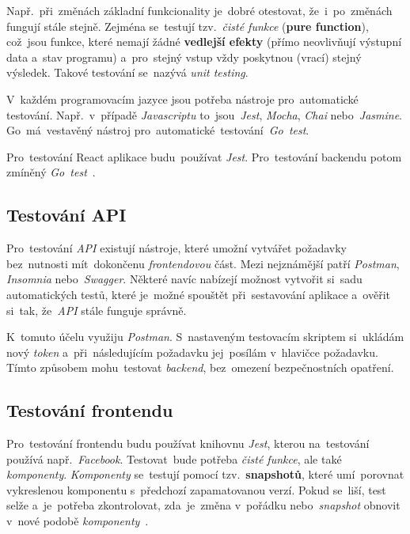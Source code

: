 \documentclass[11pt,a4paper]{report}
\begin{document}
            Např.~při~změnách základní funkcionality je~dobré otestovat, že~i~po~změnách fungují stále stejně. Zejména se~testují tzv.~\emph{čisté funkce} (\textbf{pure function}), což~jsou funkce, které nemají žádné \textbf{vedlejší efekty} (přímo neovlivňují výstupní data a~stav programu) a~pro~stejný vstup vždy poskytnou (vrací) stejný výsledek. Takové testování se~nazývá \emph{unit testing}.
            
            V~každém programovacím jazyce jsou potřeba nástroje pro~automatické testování. Např.~v~případě \emph{Javascriptu} to~jsou~\emph{Jest}, \emph{Mocha}, \emph{Chai} nebo~\emph{Jasmine}. Go~má~vestavěný nástroj pro~automatické~testování~\emph{Go~test}.
            
            Pro~testování React aplikace budu~používat \emph{Jest}. Pro~testování backendu potom zmíněný \emph{Go~test}~\cite{jestjsTestingReact}.
            
            \subsection{Testování API}
                Pro~testování \emph{API} existují nástroje, které umožní vytvářet požadavky bez~nutnosti mít~dokončenu \emph{frontendovou} část. Mezi nejznámější patří \emph{Postman}, \emph{Insomnia} nebo~\emph{Swagger}. Některé navíc nabízejí možnost vytvořit si~sadu automatických testů, které je~možné spouštět při~sestavování aplikace a~ověřit si~tak, že~\emph{API} stále funguje správně.

                K~tomuto účelu využiju \emph{Postman}. S~nastaveným testovacím skriptem si~ukládám nový \emph{token} a~při~následujícím požadavku jej~posílám v~hlavičce požadavku. Tímto způsobem mohu~testovat \emph{backend}, bez~omezení bezpečnostních opatření.

            \subsection{Testování frontendu}
                Pro~testování frontendu budu používat knihovnu \emph{Jest}, kterou na~testování používá např.~\emph{Facebook}. Testovat~bude potřeba \emph{čisté funkce}, ale také \emph{komponenty}. \emph{Komponenty} se~testují pomocí tzv.~\textbf{snapshotů}, které umí~porovnat vykreslenou komponentu s~předchozí zapamatovanou verzí. Pokud se~liší, test selže a~je~potřeba zkontrolovat, zda~je~změna v~pořádku nebo~\emph{snapshot} obnovit v~nové podobě \emph{komponenty}~\cite{jestjsTestingReact}.
\end{document}
